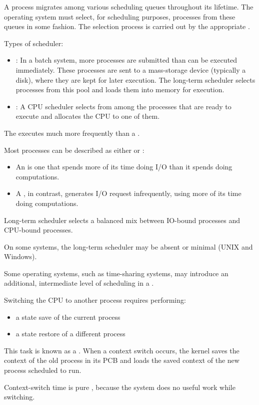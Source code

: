       \par A process migrates among various scheduling queues throughout its
        lifetime. The operating system must select, for scheduling purposes,
        processes from these queues in some fashion. The selection process is
        carried out by the appropriate .
      \par Types of scheduler:
      \begin{itemize}
        \item {}: In a batch system, more processes are submitted than can be executed immediately. These processes are sent to a mass-storage device (typically a disk), where they are kept for later execution. The long-term scheduler selects processes from this pool and loads them into memory for execution.
        \item {}: A CPU scheduler selects from among the processes that are ready to execute and allocates the CPU to one of them.
      \end{itemize}
      \par The  executes much more frequently than a .

      \par Most processes can be described as either  or :
      \begin{itemize}
        \item An  is one that spends more of its time
          doing I/O than it spends doing computations.
        \item A , in contrast, generates I/O request
          infrequently, using more of its time doing computations.
      \end{itemize}
      \par Long-term scheduler selects a balanced mix between IO-bound processes and CPU-bound processes.
      \par On some systems, the long-term scheduler may be absent or minimal (UNIX and Windows).
      \par Some operating systems, such as time-sharing systems, may introduce an additional, intermediate level of scheduling in a .

    \par Switching the CPU to another process requires performing:
      \begin{itemize}
        \item a state save of the current process
        \item a state restore of a different process
      \end{itemize}
    \par This task is known as a . When a context switch occurs, the kernel saves the context of the old process in its PCB and loads the saved context of the new process scheduled to run.
    \par Context-switch time is pure , because the system does no useful work while switching.

